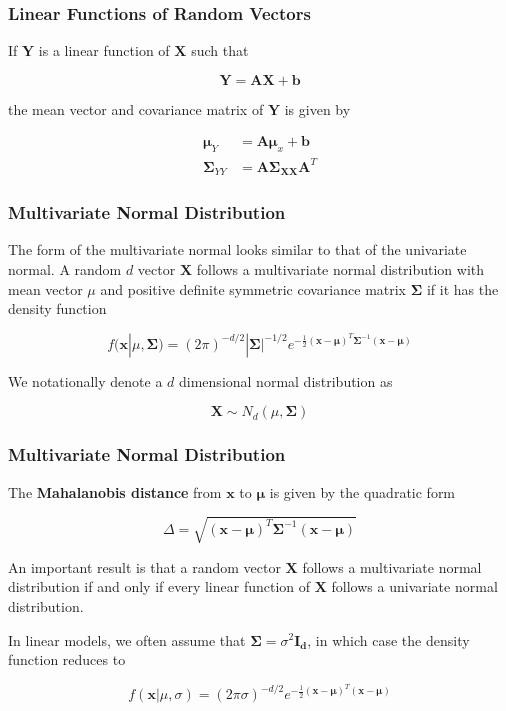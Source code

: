 \documentclass{beamer}
\begin{document}
\begin{frame}
\frametitle{Linear Functions of Random Vectors}
If $\mathbf{Y}$ is a linear function of $\mathbf{X}$ such that

$$\mathbf{Y} = \mathbf{AX} + \mathbf{b}$$

the mean vector and covariance matrix of $\mathbf{Y}$ is given by

\begin{align*}
\mathbf{\mu}_Y &= \mathbf{A\mu}_x + \mathbf{b}\\
\mathbf{\Sigma}_{YY} &= \mathbf{A\Sigma_{XX}A}^T
\end{align*}
\end{frame}

\begin{frame}
\frametitle{Multivariate Normal Distribution}
The form of the multivariate normal looks similar to that of the univariate normal.  A random $d$ vector $\mathbf{X}$ follows a multivariate normal distribution with mean vector $\mu$ and positive definite symmetric covariance matrix $\mathbf{\Sigma}$ if it has the density function

$$f(\mathbf{x}|\mu, \mathbf{\Sigma}) = (2\pi)^{-d/2}|\mathbf{\Sigma}|^{-1/2} e^{-\frac{1}{2} (\mathbf{x} - \mathbf{\mu})^T \mathbf{\Sigma}^{-1}(\mathbf{x} - \mathbf{\mu})}$$

We notationally denote a $d$ dimensional normal distribution as 

$$\mathbf{X} \sim N_d(\mu, \mathbf{\Sigma})$$
\end{frame}

\begin{frame}
\frametitle{Multivariate Normal Distribution}
The \textbf{Mahalanobis distance} from $\mathbf{x}$ to $\mathbf{\mu}$ is given by the quadratic form

$$\Delta = \sqrt{(\mathbf{x} - \mathbf{\mu})^T \mathbf{\Sigma}^{-1}(\mathbf{x} - \mathbf{\mu})}$$

An important result is that a random vector $\mathbf{X}$ follows a multivariate normal distribution if and only if every linear function of $\mathbf{X}$ follows a univariate normal distribution.
\vspace{5mm}

In linear models, we often assume that $\mathbf{\Sigma} = \sigma^2\mathbf{I_d}$, in which case the density function reduces to

$$f(\mathbf{x}|\mu, \sigma) = (2\pi \sigma)^{-d/2} e^{-\frac{1}{2} (\mathbf{x} - \mathbf{\mu})^T (\mathbf{x} - \mathbf{\mu})}$$
\end{frame}
\end{document}
